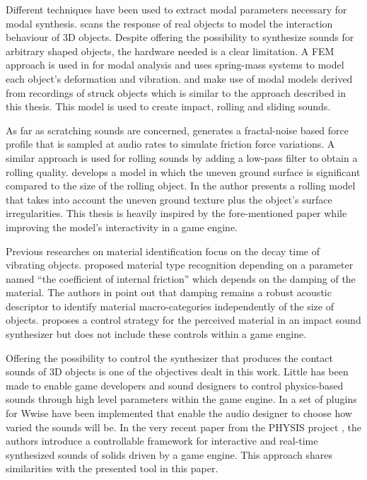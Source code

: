 Different techniques have been used to extract modal parameters necessary for modal synthesis. \cite{pai2001scanning} scans the response of real objects to model the interaction behaviour of 3D objects. Despite offering the possibility to synthesize sounds for arbitrary shaped objects, the hardware needed is a clear limitation. A \gls{FEM} approach is used in \cite{o2002synthesizing} for modal analysis and \cite{raghuvanshi2006interactive} uses spring-mass systems to model each object's deformation and vibration.\cite{van2001foleyautomatic} and \cite{lloyd2011sound} make use of modal models derived from recordings of struck objects which is similar to the approach described in this thesis. This model is used to create impact, rolling and sliding sounds.

As far as scratching sounds are concerned, \cite{van2001foleyautomatic} generates a fractal-noise based force profile that is sampled at audio rates to simulate friction force variations. A similar approach is used for rolling sounds by adding a low-pass filter to obtain a rolling quality. \cite{rath2003expressive} develops a model in which the uneven ground surface is significant compared to the size of the rolling object. In \cite{farnell2010designing} the author presents a rolling model that takes into account the uneven ground texture plus the object's surface irregularities. This thesis is heavily inspired by the fore-mentioned paper while improving the model's interactivity in a game engine.

Previous researches on material identification focus on the decay time of vibrating objects. \cite{wildes1988recovering} proposed material type recognition depending on a parameter named ``the coefficient of internal friction'' which depends on the damping of the material. The authors in \cite{giordano2006material} point out that damping remains a robust acoustic descriptor to identify material macro-categories independently of the size of objects. \cite{aramaki2011controlling} proposes a control strategy for the perceived material in an impact sound synthesizer but does not include these controls within a game engine.

Offering the possibility to control the synthesizer that produces the contact sounds of 3D objects is one of the objectives dealt in this work. Little has been made to enable game developers and sound designers to control physics-based sounds through high level parameters within the game engine. In \cite{lloyd2011sound} a set of plugins for Wwise \cite{bib:wwise} have been implemented that enable the audio designer to choose how varied the sounds will be. In the very recent paper \cite{pruvost2015perception} from the PHYSIS project \cite{bib:physis}, the authors introduce a  controllable framework for interactive and real-time synthesized sounds of solids driven by a game engine. This approach shares similarities with the presented tool in this paper.

